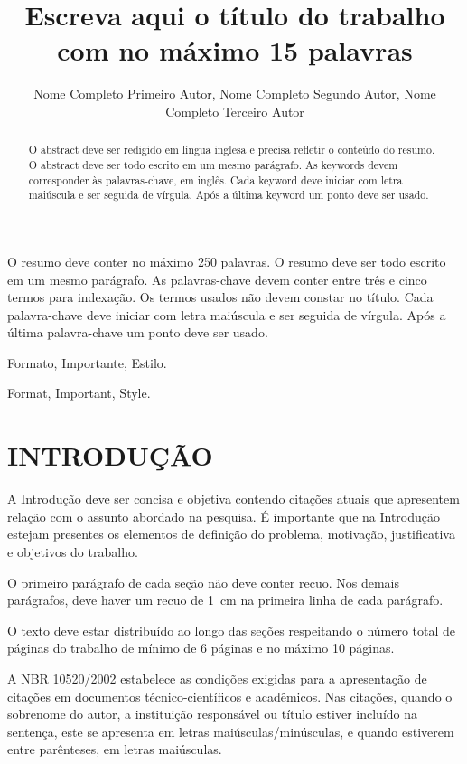 \documentclass[brazil,12pt]{article}
\title{Escreva aqui o título do trabalho com no máximo 15 palavras}
\author{Nome Completo Primeiro Autor\inst{1}, Nome Completo Segundo Autor\inst{2}, Nome Completo Terceiro Autor\inst{1}}
\begin{document}
\maketitle

\thispagestyle{firstpage}

\begin{resumo} 
O resumo deve conter no máximo 250 palavras. O resumo deve ser todo
escrito em um mesmo parágrafo. As palavras-chave devem conter entre
três e cinco termos para indexação. Os termos usados não devem constar
no título. Cada palavra-chave deve iniciar com letra maiúscula e ser
seguida de vírgula. Após a última palavra-chave um ponto deve ser
usado. 
\end{resumo}
\begin{palavraschave}
Formato, Importante, Estilo.
\end{palavraschave}

\begin{abstract}
O abstract deve ser redigido em língua inglesa e precisa refletir o
conteúdo do resumo. O abstract deve ser todo escrito em um mesmo
parágrafo. As keywords devem corresponder às palavras-chave, em
inglês. Cada keyword deve iniciar com letra maiúscula e ser seguida de
vírgula. Após a última keyword um ponto deve ser usado. 
\end{abstract}
\begin{keywords}
Format, Important, Style.
\end{keywords}     

\section*{INTRODUÇÃO}
A Introdução deve ser concisa e objetiva contendo citações atuais que
apresentem relação com o assunto abordado na pesquisa. É importante
que na Introdução estejam presentes os elementos  de definição do
problema, motivação, justificativa e objetivos do trabalho. 

O primeiro parágrafo de cada seção não deve conter recuo. Nos demais
parágrafos, deve haver um recuo de 1~cm na primeira linha de cada
parágrafo. 

O texto deve estar distribuído ao longo das seções respeitando o
número total de páginas do trabalho de mínimo de 6 páginas e no máximo
10 páginas.  

A NBR 10520/2002 estabelece as condições exigidas para a apresentação
de citações em documentos técnico-científicos e acadêmicos. Nas
citações, quando o sobrenome do autor, a instituição responsável ou
título estiver incluído na sentença, este se apresenta em letras
maiúsculas/minúsculas, e quando estiverem entre parênteses, em letras
maiúsculas. 
\end{document}
